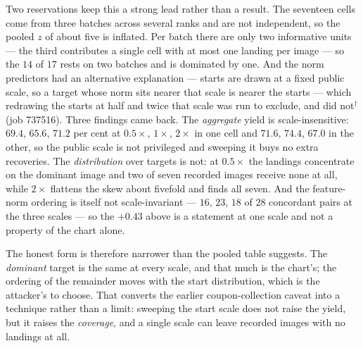 Two reservations keep this a strong lead rather than a result. The seventeen
cells come from three batches across several ranks and are not independent, so
the pooled $z$ of about five is inflated. Per batch there are only two
informative units --- the third contributes a single cell with at most one
landing per image --- so the $14$ of $17$ rests on two batches and is
dominated by one. And the norm predictors had an alternative
explanation --- starts are drawn at a fixed public scale, so a target whose
norm sits nearer that scale is nearer the starts --- which redrawing the
starts at half and twice that scale was run to exclude, and did not$^\dagger$
(job 737516). Three findings came back. The \emph{aggregate} yield is
scale-insensitive: $69.4$, $65.6$, $71.2$ per cent at $0.5\times$, $1\times$,
$2\times$ in one cell and $71.6$, $74.4$, $67.0$ in the other, so the public
scale is not privileged and sweeping it buys no extra recoveries. The
\emph{distribution} over targets is not: at $0.5\times$ the landings
concentrate on the dominant image and two of seven recorded images receive
none at all, while $2\times$ flattens the skew about fivefold and finds all
seven. And the feature-norm ordering is itself not scale-invariant --- $16$,
$23$, $18$ of $28$ concordant pairs at the three scales --- so the $+0.43$
above is a statement at one scale and not a property of the chart alone.

The honest form is therefore narrower than the pooled table suggests. The
\emph{dominant} target is the same at every scale, and that much is the
chart's; the ordering of the remainder moves with the start distribution,
which is the attacker's to choose. That converts the earlier
coupon-collection caveat into a technique rather than a limit: sweeping the
start scale does not raise the yield, but it raises the \emph{coverage}, and
a single scale can leave recorded images with no landings at all.

